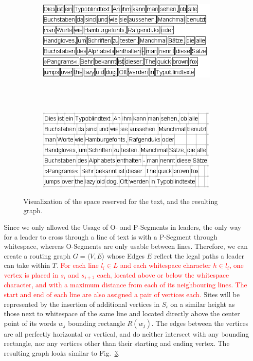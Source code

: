 \documentclass[11pt,a4paper]{vutinfth}
\newcommand{\change}[1]{\textcolor{red}{#1}}
\begin{document}
\begin{figure}
 \centering
 \begin{subfigure}[b]{\textwidth}
 \centering
  \includegraphics[]{WordBoundaries.png}
  \caption{\label{fig:wbound}}
 \end{subfigure}
 \\
 ~\\%
 \begin{subfigure}[b]{\textwidth}
 \centering
  \includegraphics[]{RoutingGraph_edited.png}
  \caption{\label{fig:rgraph}}
 \end{subfigure}
 \caption{Visualization of the space reserved for the text, and the resulting graph.}
\end{figure}

Since we only allowed the Usage of O- and P-Segments in leaders, the only way for a leader to cross through a line of text is with a P-Segment through whitespace, whereas O-Segments are only usable between lines. Therefore, we can create a routing graph $G=\langle V,E\rangle$ whose Edges $E$ reflect the legal paths a leader can take within $T$.
\change{For each line $l_i \in L$ and each whitespace character $h \in l_i$, one vertex is placed in $s_i$ and $s_{i+1}$ each, located above or below the whitespace character, and with a maximum distance from each of its neighbouring lines. The start and end of each line are also assigned a pair of vertices each.} Sites will be represented by the insertion of additional vertices in $S_i$ on a similar height as those next to whitespace of the same line and located directly above the center point of its words $w_j$ bounding rectangle $R(w_j)$. The edges between the vertices are all perfectly horizontal or vertical, and do neither intersect with any bounding rectangle, nor any vertices other than their starting and ending vertex. The resulting graph looks similar to Fig.~\ref{fig:rgraph}.
\end{document}
